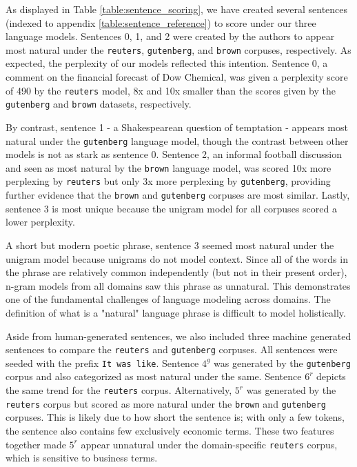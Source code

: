 \documentclass[11pt,a4paper]{article}
\begin{document}

As displayed in Table \ref{table:sentence_scoring}, we have created several sentences (indexed to appendix \ref{table:sentence_reference}) to score 
under our three language models. Sentences 0, 1, and 2 were created by the authors to appear most natural under the   \texttt{reuters},   \texttt{gutenberg}, and \texttt{brown} corpuses, respectively. As expected, the perplexity of our models reflected this intention. Sentence 0, a comment on the financial forecast of Dow Chemical, was given a perplexity score of 490 by the  \texttt{reuters} model, 8x and 10x smaller than the scores given by the \texttt{gutenberg} and \texttt{brown} datasets, respectively. 

By contrast, sentence 1 - a Shakespearean question of temptation - appears most natural under the \texttt{gutenberg} language model, though the contrast between other models is not as stark as sentence 0. Sentence 2, an informal football discussion and seen as most natural by the \texttt{brown} language model, was scored 10x more perplexing by \texttt{reuters} but only 3x more perplexing by \texttt{gutenberg}, providing further evidence that the \texttt{brown} and \texttt{gutenberg} corpuses are most similar. Lastly, sentence 3 is most unique because the unigram model for all corpuses scored a lower perplexity. 

A short but modern poetic phrase, sentence 3 seemed most natural under the unigram model because unigrams do not model context. Since all of the words in the phrase are relatively common independently (but not in their present order), n-gram models from all domains saw this phrase as unnatural. This demonstrates one of the fundamental challenges of language modeling across domains. The definition of what is a "natural" language phrase is difficult to model holistically. 

Aside from human-generated sentences, we also included three machine generated sentences to compare the \texttt{reuters} and \texttt{gutenberg} corpuses. All sentences were seeded with the prefix \texttt{It was like}. Sentence $4^{g}$ was generated by the \texttt{gutenberg} corpus and also categorized as most natural under the same. Sentence $6^{r}$ depicts the same trend for the \texttt{reuters} corpus. Alternatively, $5^{r}$ was generated by the \texttt{reuters} corpus but scored as more natural under the \texttt{brown} and \texttt{gutenberg} corpuses. This is likely due to how short the sentence is; with only a few tokens, the sentence also contains few exclusively economic terms. These two features together made $5^{r}$ appear unnatural under the domain-specific \texttt{reuters} corpus, which is sensitive to business terms.
\end{document}
